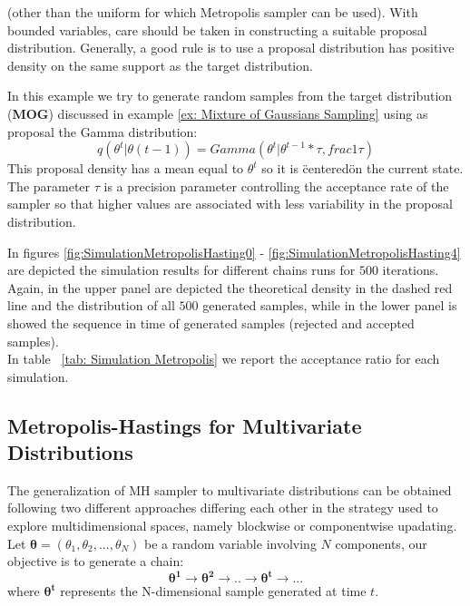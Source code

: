 (other than the uniform for which Metropolis sampler can be used). With bounded variables, care should be taken in constructing a suitable proposal distribution. Generally, a
good rule is to use a proposal distribution has positive density on the same support as the
target distribution.
\begin{example} \label{ex: Mixture of Gaussians Sampling 2}
In this example we try to generate random samples from the target distribution (\textbf{MOG}) discussed in example \ref{ex: Mixture of Gaussians Sampling}  using as proposal the Gamma distribution:
$$
q(\theta^t|\theta(t-1))= Gamma(\theta^t| \theta^{t-1} * \tau , frac{1}{\tau})
$$
This proposal density has a mean equal to $\theta^t$ so it is \"centered\" on the current state. The parameter $\tau$ is a precision parameter controlling the acceptance rate of the sampler so that higher values are associated with less variability in the proposal distribution.

In figures \ref{fig:SimulationMetropolisHasting0} - \ref{fig:SimulationMetropolisHasting4} are depicted the simulation results for different chains runs for $500$ iterations.
Again, in the upper panel are depicted the theoretical density in the dashed red line and the distribution of all $500$ generated samples, while in the lower panel is showed the sequence in time of generated samples (rejected and accepted samples).\\
In table ~\ref{tab: Simulation Metropolis} we report the acceptance ratio for each simulation.\\

\end{example}
\newpage
\subsection{Metropolis-Hastings for Multivariate Distributions}
The generalization of MH sampler to multivariate distributions can be obtained following two different approaches differing each other in the strategy used to explore multidimensional spaces, namely blockwise or componentwise upadating.
Let $\mathbf{\theta} = (\theta_1, \theta_2 , . . . ,\theta_N )$ be a random variable involving $N$ components, our objective is to generate a chain:
$$
\mathbf{\theta^1}  \rightarrow  \mathbf{\theta^2}  \rightarrow . .  \rightarrow  \mathbf{\theta^t}  \rightarrow . . .
$$
where  $\mathbf{\theta^t}$ represents the N-dimensional sample generated at time $t$.

